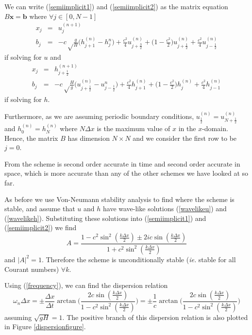 \documentclass[a4paper, 10.5pt, notitlepage]{article}
\begin{document}
We can write (\ref{semiimplicit1}) and (\ref{semiimplicit2}) as the matrix equation $B \mathbf{x} = \mathbf{b}$ where $ \forall j \in [0, N-1]$
\begin{eqnarray}
x_{j} &= & u_{j}^{(n+1)}\\
b_{j} &= & -c\sqrt\frac{g}{H}\bigg(h_{j + 1}^{(n)} - h_{j}^{n}\bigg) + \frac{c^{2}}{4} u_{j + \frac{3}{2}}^{(n)} + \bigg(1 - \frac{c^{2}}{2}\bigg)u_{j + \frac{1}{2}}^{(n)} + \frac{c^{2}}{4} u_{j - \frac{1}{2}}^{(n)}
\end{eqnarray}
if solving for $u$ and
\begin{eqnarray}
x_{j} & =& h_{j+ \frac{1}{2}}^{(n+1)} \\
b_{j} &= &-c\sqrt\frac{H}{g}\bigg(u_{j + \frac{1}{2}}^{(n)} - u_{j - \frac{1}{2}}^{n}\bigg) + \frac{c^{2}}{4} h_{j + 1}^{(n)} + \bigg(1 - \frac{c^{2}}{2}\bigg)h_{j}^{(n)} + \frac{c^{2}}{4} h_{j - 1}^{(n)}
\end{eqnarray}
if solving for $h$.

Furthermore, as we are assuming periodic boundary conditions, $u_{\frac{1}{2}}^{(n)} = u_{N + \frac{1}{2}}^{(n)}$ and $h_{0}^{(n)} = h_{N}^{(n)}$ where $N\Delta x$ is the maximum value of $x$ in the $x$-domain. Hence, the matrix $B$ has dimension $N \times N$ and we consider the first row to be $j = 0$.

From \cite{implicit} the scheme is second order accurate in time and second order accurate in space, which is more accurate than any of the other schemes we have looked at so far.

As before we use Von-Neumann stability analysis to find where the scheme is stable, and assume that $u$ and $h$ have wave-like solutions (\ref{wavelikeu}) and (\ref{wavelikeh}). Substituting these solutions into (\ref{semiimplicit1}) and (\ref{semiimplicit2}) we find
\begin{equation}
A = \frac{1 - c^{2}\sin^{2}(\frac{k\Delta x}{2}) \pm 2ic\sin(\frac{k\Delta x}{2})}{1 + c^{2}\sin^{2}(\frac{k\Delta x}{2})}
\end{equation}
and $\lvert A \rvert^{2} = 1$. Therefore the scheme is unconditionally stable (\textit{ie.} stable for all Courant numbers) $\forall k$.

Using (\ref{frequency}), we can find the dispersion relation
\begin{equation}
\omega_{n} \Delta x = \pm\frac{\Delta x}{\Delta t} \arctan\bigg(\frac{2 c \sin(\frac{k\Delta x}{2})}{1 - c^{2} \sin^{2}(\frac{k\Delta x}{2})}\bigg) = \pm\frac{1}{c} \arctan\bigg(\frac{2 c \sin(\frac{k\Delta x}{2})}{1 - c^{2} \sin^{2}(\frac{k\Delta x}{2})}\bigg)
\end{equation}
assuming $\sqrt{gH} = 1$. The positive branch of this dispersion relation is also plotted in Figure \ref{dispersionfigure}. 
\end{document}

